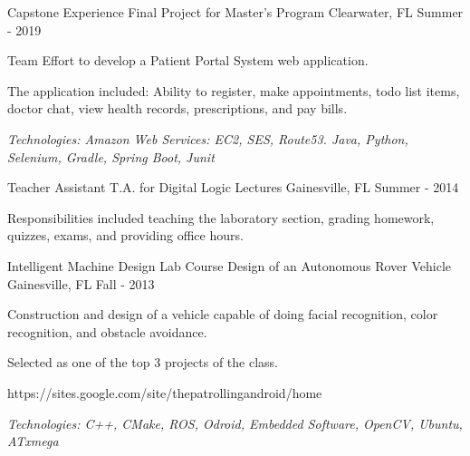 

\begin{cventries}

	\cventry
		{Capstone Experience} %
		{Final Project for Master's Program} %
		{Clearwater, FL} %
		{Summer - 2019} %
		{
			\begin{cvitems} %
			\item {Team Effort to develop a Patient Portal System web application.}
			\item {The application included: Ability to register, make appointments, todo list items, doctor chat, view health records, prescriptions, and pay bills.}
      \item {\it{Technologies:} Amazon Web Services: EC2, SES, Route53. Java, Python, Selenium, Gradle, Spring Boot, Junit}
			\end{cvitems}
		}

	\cventry
		{Teacher Assistant} %
		{T.A. for Digital Logic Lectures} %
		{Gainesville, FL} %
		{Summer - 2014} %
		{
			\begin{cvitems} %
			\item {Responsibilities included teaching the laboratory section, grading homework, quizzes, exams, and providing office hours.}
			\end{cvitems}
		}

	\cventry
		{Intelligent Machine Design Lab Course} %
		{Design of an Autonomous Rover Vehicle} %
		{Gainesville, FL} %
		{Fall - 2013} %
		{
			\begin{cvitems} %
				\item {Construction and design of a vehicle capable of doing facial recognition, color recognition, and
					obstacle avoidance.}
        \item {Selected as one of the top 3 projects of the class.}
        \item {https://sites.google.com/site/thepatrollingandroid/home}
				\item {\it{Technologies:} C++, CMake, ROS, Odroid, Embedded Software, OpenCV, Ubuntu, ATxmega}
			\end{cvitems}
		}

\end{cventries}
